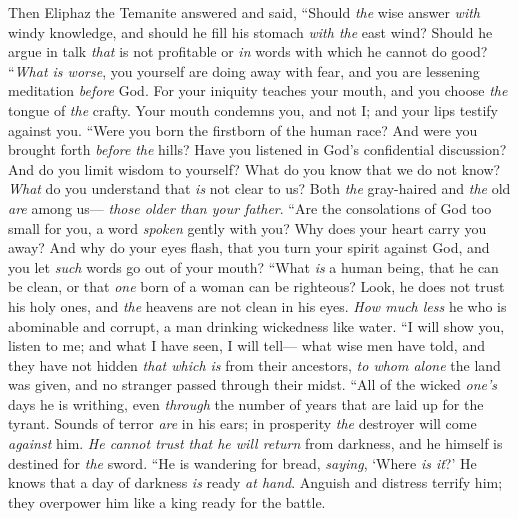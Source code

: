 \begin{biblechapter} %
 Then Eliphaz the Temanite answered and said,
\verse “Should \textit{the} wise answer \textit{with} windy knowledge, 
and should he fill his stomach \textit{with the} east wind?
\verse Should he argue in talk \textit{that} is not profitable 
or \textit{in} words with which he cannot do good?
\verse “\textit{What is worse}, you yourself are doing away with fear, 
and you are lessening meditation \textit{before} God.
\verse For your iniquity teaches your mouth, 
and you choose \textit{the} tongue of \textit{the} crafty.
\verse Your mouth condemns you, and not I; 
and your lips testify against you.
\verse “Were you born the firstborn of the human race? 
And were you brought forth \textit{before} \textit{the} hills?
\verse Have you listened in God’s confidential discussion? 
And do you limit wisdom to yourself?
\verse What do you know that we do not know? 
\textit{What} do you understand that \textit{is} not clear to us?
\verse Both \textit{the} gray-haired and \textit{the} old \textit{are} among us— 
\textit{those older than your father}.
\verse “Are the consolations of God too small for you, 
a word \textit{spoken} gently with you?
\verse Why does your heart carry you away? 
And why do your eyes flash,
\verse that you turn your spirit against God, 
and you let \textit{such} words go out of your mouth?
\verse “What \textit{is} a human being, that he can be clean, 
or that \textit{one} born of a woman can be righteous?
\verse Look, he does not trust his holy ones, 
and \textit{the} heavens are not clean in his eyes.
\verse \textit{How much less} he who is abominable and corrupt, 
a man drinking wickedness like water.
\verse “I will show you, listen to me; 
and what I have seen, I will tell—
\verse what wise men have told, 
and they have not hidden \textit{that which is} from their ancestors,
\verse \textit{to whom alone} the land was given, 
and no stranger passed through their midst.
\verse “All of the wicked \textit{one’s} days he is writhing, 
even \textit{through} the number of years that are laid up for the tyrant.
\verse Sounds of terror \textit{are} in his ears; 
in prosperity \textit{the} destroyer will come \textit{against} him.
\verse \textit{He cannot trust that he will return} from darkness, 
and he himself is destined for \textit{the} sword.
\verse “He is wandering for bread, \textit{saying}, ‘Where \textit{is it}?’ 
He knows that a day of darkness \textit{is} ready \textit{at hand}.
\verse Anguish and distress terrify him; 
they overpower him like a king ready for the battle.

\end{biblechapter}
